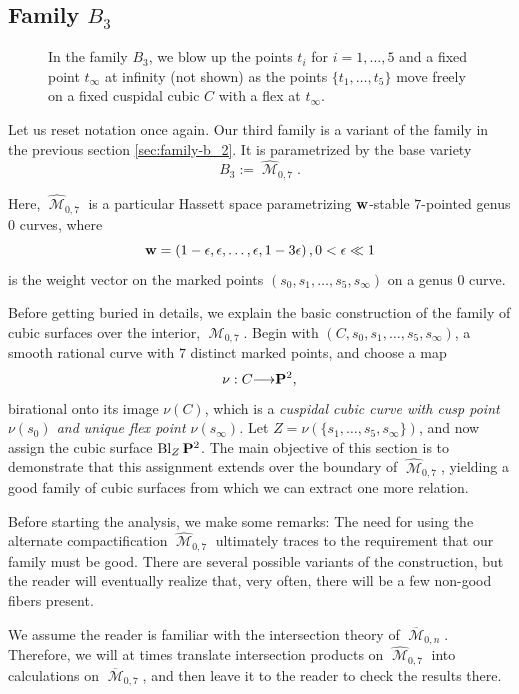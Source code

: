 \documentclass[12pt,reqno]{amsart}
\DeclareMathOperator{\Bl}{Bl}
\DeclareMathOperator{\M}{\mathcal{M}}
\renewcommand{\to}{{\longrightarrow}}
\numberwithin{equation}{section}
\newcommand{\hM}{\widehat{\M}}
\renewcommand {\o}[1]{\overline{#1}}
\begin{document}
\subsection{Family $B_3$}
\label{sec:family-b_3}


\begin{figure}[!]
    \centering
    
    \caption{In the family $B_3$, we blow up the points $t_i$ for $i = 1, \dots, 5$ and a fixed point $t_\infty$ at infinity (not shown) as the points $\{t_1, \dots, t_5\}$ move freely on a fixed cuspidal cubic $C$ with a flex at $t_\infty$.}
    \label{fig:FigureB3}
\end{figure}


Let us reset notation once again.  Our third family is a variant of
the family in the previous section \autoref{sec:family-b_2}.  It is
parametrized by the base variety
$$B_{3} := \hM_{0,7}.$$

Here, $\hM_{0,7}$ is a particular Hassett space parametrizing
${\bf w}$-stable $7$-pointed genus $0$ curves, where
$${\bf w} = \left(1-\epsilon, \epsilon, \dots, \epsilon, 1-3 \epsilon \right), 0 < \epsilon \ll 1$$
is the weight vector on the marked points
$(s_{0}, s_{1}, \dots, s_{5}, s_{\infty})$ on a genus $0$ curve.

Before getting buried in details, we explain the basic construction of
the family of cubic surfaces over the interior, $\M_{0,7}$.  Begin
with $(C, s_{0}, s_{1}, \dots, s_{5}, s_{\infty})$, a smooth rational
curve with $7$ distinct marked points, and choose a map
$$\nu: C \to \P^{2},$$ birational onto its image
$\nu(C)$, which is a {\sl cuspidal cubic curve with cusp point
  $\nu(s_{0})$ and unique flex point $\nu(s_{\infty})$.}  Let
$Z = \nu(\{s_{1}, \dots, s_{5}, s_{\infty}\}) $, and now assign the
cubic surface $\Bl_{Z}\P^{2}$.  The main objective of this section is
to demonstrate that this assignment extends over the boundary of
$\hM_{0,7}$, yielding a good family of cubic surfaces from which we
can extract one more relation.

Before starting the analysis, we make some remarks: The need for using
the alternate compactification $\hM_{0,7}$ ultimately traces to the
requirement that our family must be good.  There are several possible
variants of the construction, but the reader will eventually realize
that, very often, there will be a few non-good fibers present.


We assume the reader is familiar with the intersection theory of
$\o{\M}_{0,n}$.  Therefore, we will at times translate intersection
products on $\hM_{0,7}$ into calculations on $\o{\M}_{0,7}$, and then
leave it to the reader to check the results there.
\end{document}
